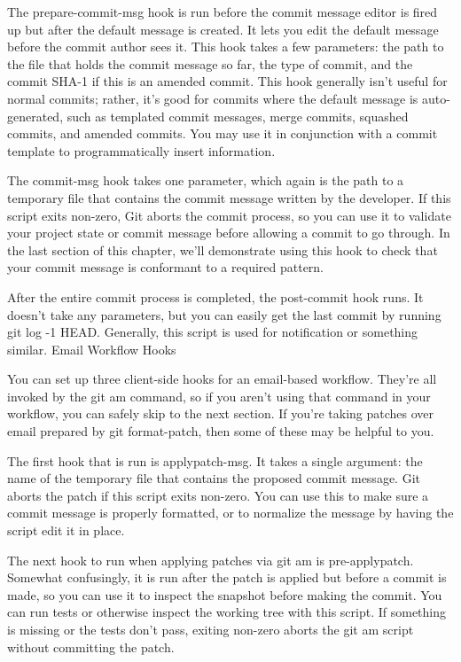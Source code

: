 The prepare-commit-msg hook is run before the commit message editor is fired up but after the default message is created. It lets you edit the default message before the commit author sees it. This hook takes a few parameters: the path to the file that holds the commit message so far, the type of commit, and the commit SHA-1 if this is an amended commit. This hook generally isn’t useful for normal commits; rather, it’s good for commits where the default message is auto-generated, such as templated commit messages, merge commits, squashed commits, and amended commits. You may use it in conjunction with a commit template to programmatically insert information.

The commit-msg hook takes one parameter, which again is the path to a temporary file that contains the commit message written by the developer. If this script exits non-zero, Git aborts the commit process, so you can use it to validate your project state or commit message before allowing a commit to go through. In the last section of this chapter, we’ll demonstrate using this hook to check that your commit message is conformant to a required pattern.

After the entire commit process is completed, the post-commit hook runs. It doesn’t take any parameters, but you can easily get the last commit by running git log -1 HEAD. Generally, this script is used for notification or something similar.
Email Workflow Hooks

You can set up three client-side hooks for an email-based workflow. They’re all invoked by the git am command, so if you aren’t using that command in your workflow, you can safely skip to the next section. If you’re taking patches over email prepared by git format-patch, then some of these may be helpful to you.

The first hook that is run is applypatch-msg. It takes a single argument: the name of the temporary file that contains the proposed commit message. Git aborts the patch if this script exits non-zero. You can use this to make sure a commit message is properly formatted, or to normalize the message by having the script edit it in place.

The next hook to run when applying patches via git am is pre-applypatch. Somewhat confusingly, it is run after the patch is applied but before a commit is made, so you can use it to inspect the snapshot before making the commit. You can run tests or otherwise inspect the working tree with this script. If something is missing or the tests don’t pass, exiting non-zero aborts the git am script without committing the patch.

